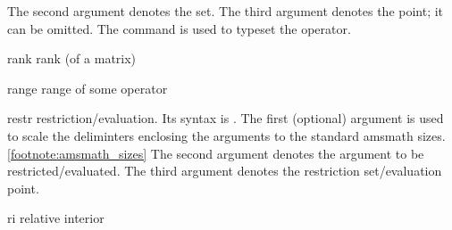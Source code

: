 \documentclass[english,a4paper,DIV=12,parskip=full,oneside]{scrartcl}
\begin{document}
\begin{commandlist}
            The second argument denotes the set.
            The third argument denotes the point; it can be omitted.
            The command \codeCommand{\proxOp} is used to typeset the operator.
            \par\mathCodeExample{\prox}
            \par{} %
            \par{} %
            \par{} %
        \item[rank] rank (of a matrix) \mathCodeExample{\rank}
        \item[range] range of some operator \mathCodeExample{\range}
        \item[restr] restriction/evaluation.
            Its syntax is .
            The first (optional) argument is used to scale the deliminters enclosing the arguments to the standard amsmath sizes.\cref{footnote:amsmath_sizes}
            The second argument denotes the argument to be restricted/evaluated.
            The third argument denotes the restriction set/evaluation point.
            \par{}
        \item[ri] relative interior \mathCodeExample{\ri}



\end{commandlist}
\end{document}
